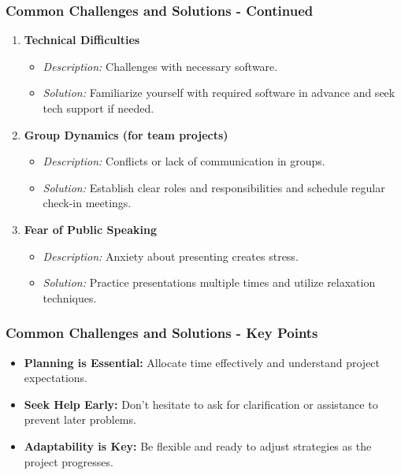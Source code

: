\documentclass{beamer}
\begin{document}
\begin{frame}[fragile]
    \frametitle{Common Challenges and Solutions - Continued}
    \begin{enumerate}[resume]
        \item \textbf{Technical Difficulties}
            \begin{itemize}
                \item \textit{Description:} Challenges with necessary software.
                \item \textit{Solution:} Familiarize yourself with required software in advance and seek tech support if needed.
            \end{itemize}

        \item \textbf{Group Dynamics (for team projects)}
            \begin{itemize}
                \item \textit{Description:} Conflicts or lack of communication in groups.
                \item \textit{Solution:} Establish clear roles and responsibilities and schedule regular check-in meetings.
            \end{itemize}

        \item \textbf{Fear of Public Speaking}
            \begin{itemize}
                \item \textit{Description:} Anxiety about presenting creates stress.
                \item \textit{Solution:} Practice presentations multiple times and utilize relaxation techniques.
            \end{itemize}
    \end{enumerate}
\end{frame}

\begin{frame}[fragile]
    \frametitle{Common Challenges and Solutions - Key Points}
    \begin{itemize}
        \item \textbf{Planning is Essential:} Allocate time effectively and understand project expectations.
        \item \textbf{Seek Help Early:} Don't hesitate to ask for clarification or assistance to prevent later problems.
        \item \textbf{Adaptability is Key:} Be flexible and ready to adjust strategies as the project progresses.
    \end{itemize}
\end{frame}
\end{document}
